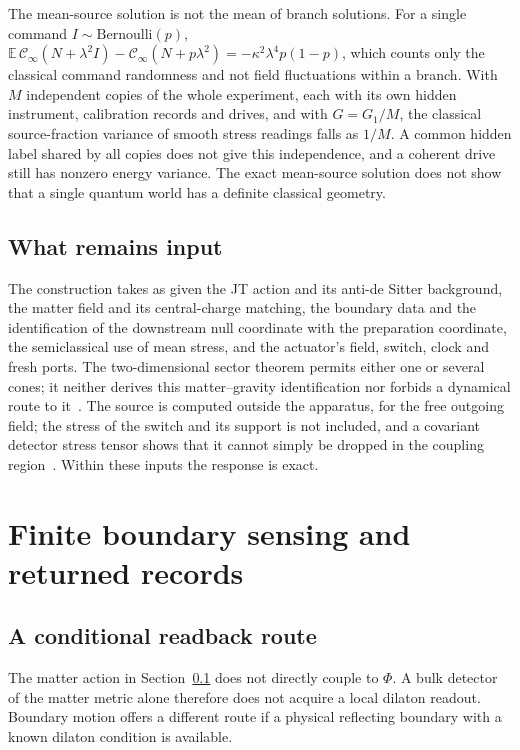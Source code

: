 \documentclass[12pt,a4paper]{article}
\begin{document}
The mean-source solution is not the mean of branch solutions. For a single command $I\sim\mathrm{Bernoulli}(p)$, $\mathbb E\,\mathcal C_\infty(N+\lambda^2I)-\mathcal C_\infty(N+p\lambda^2)=-\kappa^2\lambda^4p(1-p)$, which counts only the classical command randomness and not field fluctuations within a branch. With $M$ independent copies of the whole experiment, each with its own hidden instrument, calibration records and drives, and with $G=G_1/M$, the classical source-fraction variance of smooth stress readings falls as $1/M$. A common hidden label shared by all copies does not give this independence, and a coherent drive still has nonzero energy variance. The exact mean-source solution does not show that a single quantum world has a definite classical geometry.

\subsection{What remains input}
\label{sec:inputs}

The construction takes as given the JT action and its anti-de Sitter background, the
matter field and its central-charge matching, the boundary data and the identification
of the downstream null coordinate with the preparation coordinate, the semiclassical
use of mean stress, and the actuator's field, switch, clock and fresh ports. The
two-dimensional sector theorem permits either one or several cones; it neither
derives this matter--gravity identification nor forbids a dynamical route to it~\cite{Liu2026QRAIF_A}.
The source is computed outside the apparatus, for the free outgoing field; the stress
of the switch and its support is not included, and a covariant detector stress tensor
shows that it cannot simply be dropped in the coupling region~\cite{Perche2025}.
Within these inputs the response is exact.


\section{Finite boundary sensing and returned records}
\label{app:boundary-return}

\subsection{A conditional readback route}
\label{sec:echo}

The matter action in Section~\ref{sec:inputs} does not directly couple to
$\Phi$. A bulk detector of the matter metric alone therefore does not acquire a
local dilaton readout. Boundary motion offers a different route if a physical
reflecting boundary with a known dilaton condition is available.
\end{document}
